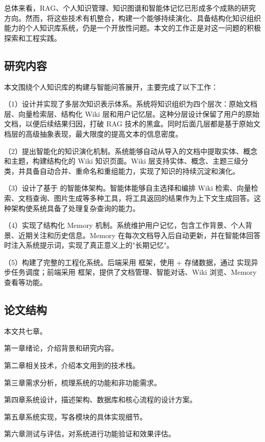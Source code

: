 总体来看，RAG、个人知识管理、知识图谱和智能体记忆已形成多个成熟的研究方向。然而，将这些技术有机整合，构建一个能够持续演化、具备结构化知识组织能力的个人知识库系统，仍是一个开放性问题。本文的工作正是对这一问题的积极探索和工程实践。

\subsection{研究内容}

本文围绕个人知识库的构建与智能问答展开，主要完成了以下工作：

（1）设计并实现了多层次知识表示体系。系统将知识组织为四个层次：原始文档层、向量检索层、结构化 Wiki 层和用户记忆层。这种分层设计保留了用户的原始文档，以便后续结果归因，打破 RAG 技术的黑盒。同时后面几层都是基于原始文档层的高级抽象表现，最大限度的提高文本的信息密度。

（2）提出智能化的知识演化机制。系统能够自动从导入的文档中提取实体、概念和主题，构建结构化的 Wiki 知识页面。Wiki 层支持实体、概念、主题三级分类，并具备自动合并、重命名和重组能力，实现了知识的持续沉淀和演化。

（3）设计了基于  的智能体架构。智能体能够自主选择和编排 Wiki 检索、向量检索、文档查询、图片生成等多种工具，将工具返回的结果作为上下文生成回答。这种架构使系统具备了处理复杂查询的能力。

（4）实现了结构化 Memory 机制。系统维护用户记忆，包含工作背景、个人背景、近期关注和历史信息。Memory 在每次文档导入后自动更新，并在智能体回答时注入系统提示词，实现了真正意义上的"长期记忆"。

（5）构建了完整的工程化系统。后端采用  框架，使用  +  存储数据，通过  实现异步任务调度；前端采用  框架，提供了文档管理、智能对话、Wiki 浏览、Memory 查看等功能。

\subsection{论文结构}

本文共七章。

第一章绪论，介绍背景和研究内容。

第二章相关技术，介绍本文用到的技术栈。

第三章需求分析，梳理系统的功能和非功能需求。

第四章系统设计，描述架构、数据库和核心流程的设计方案。

第五章系统实现，写各模块的具体实现细节。

第六章测试与评估，对系统进行功能验证和效果评估。

